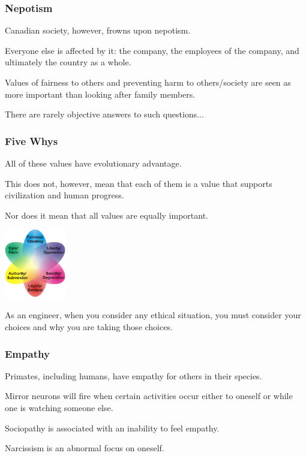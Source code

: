 \begin{frame}
\frametitle{Nepotism}

Canadian society, however, frowns upon nepotism.

Everyone else is affected by it: the company, the employees of the company, and ultimately the country as a whole.

Values of fairness to others and preventing harm to others/society are seen as more important than looking after family members.

There are rarely objective answers to such questions...

\end{frame}



\begin{frame}
\frametitle{Five Whys}

All of these values have evolutionary advantage.

This does not, however, mean that each of them is a value that supports civilization and human progress.

Nor does it mean that all values are equally important.


\begin{center}
	\includegraphics[width=0.2\textwidth]{images/moralcompass}
\end{center}


As an engineer, when you consider any ethical situation, you must consider your choices and why you are taking those choices.
\end{frame}



\begin{frame}
\frametitle{Empathy}

Primates, including humans, have empathy for others in their species.

Mirror neurons will fire when certain activities occur either to oneself or while one is watching someone else.

Sociopathy is associated with an inability to feel empathy.

Narcissism is an abnormal focus on oneself.

\end{frame}



